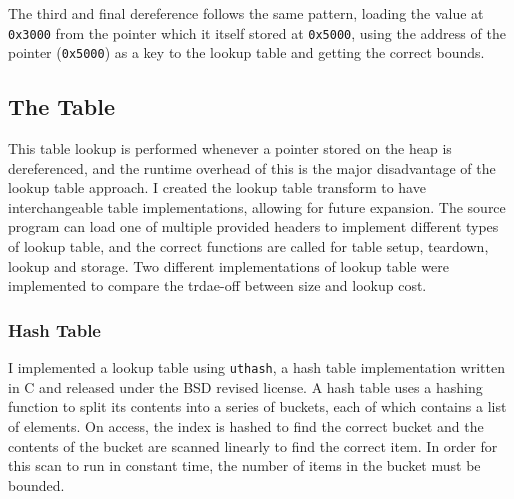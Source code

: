 The third and final dereference follows the same pattern, loading the value at \verb!0x3000! from the pointer which it itself stored at \verb!0x5000!, using the address of the pointer (\verb!0x5000!) as a key to the lookup table and getting the correct bounds.

\subsection{The Table}

This table lookup is performed whenever a pointer stored on the heap is dereferenced, and the runtime overhead of this is the major disadvantage of the lookup table approach.
I created the lookup table transform to have interchangeable table implementations, allowing for future expansion.
The source program can load one of multiple provided headers to implement different types of lookup table, and the correct functions are called for table setup, teardown, lookup and storage.
Two different implementations of lookup table were implemented to compare the trdae-off between size and lookup cost.

%
%

\subsubsection{Hash Table}

I implemented a lookup table using \verb!uthash!, a hash table implementation written in C and released under the BSD revised license. 
A hash table uses a hashing function to split its contents into a series of buckets, each of which contains a list of elements.
On access, the index is hashed to find the correct bucket and the contents of the bucket are scanned linearly to find the correct item.
In order for this scan to run in constant time, the number of items in the bucket must be bounded.

